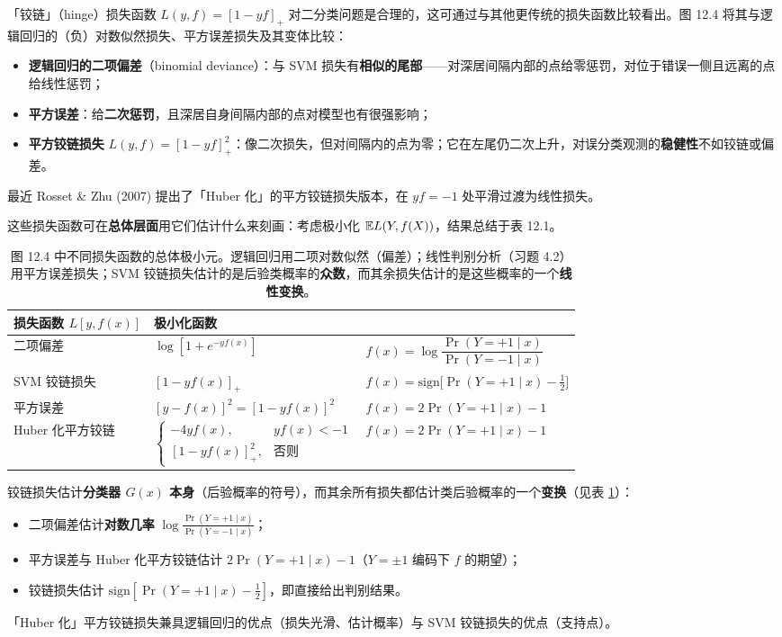 \begin{remark}[铰链损失]
「铰链」（hinge）损失函数 $L(y,f) = [1-yf]_+$ 对二分类问题是合理的，这可通过与其他更传统的损失函数比较看出。图 12.4 将其与逻辑回归的（负）对数似然损失、平方误差损失及其变体比较：
\begin{itemize}
\item \textbf{逻辑回归的二项偏差}（binomial deviance）：与 SVM 损失有\textbf{相似的尾部}——对深居间隔内部的点给零惩罚，对位于错误一侧且远离的点给线性惩罚；
\item \textbf{平方误差}：给\textbf{二次惩罚}，且深居自身间隔内部的点对模型也有很强影响；
\item \textbf{平方铰链损失} $L(y,f) = [1-yf]_+^2$：像二次损失，但对间隔内的点为零；它在左尾仍二次上升，对误分类观测的\textbf{稳健性}不如铰链或偏差。
\end{itemize}
最近 Rosset \& Zhu (2007) 提出了「Huber 化」的平方铰链损失版本，在 $yf=-1$ 处平滑过渡为线性损失。
\end{remark}

这些损失函数可在\textbf{总体层面}用它们估计什么来刻画：考虑极小化 $\mathbb{E} L(Y,f(X))$，结果总结于表 12.1。

\begin{table}[htbp]
\centering
\caption{图 12.4 中不同损失函数的总体极小元。逻辑回归用二项对数似然（偏差）；线性判别分析（习题 4.2）用平方误差损失；SVM 铰链损失估计的是后验类概率的\textbf{众数}，而其余损失估计的是这些概率的一个\textbf{线性变换}。}
\label{tab:12_1}
\begin{tabular}{lll}
\toprule
损失函数 $L[y,f(x)]$ & 极小化函数 \\
\midrule
二项偏差 & $\log[1+e^{-yf(x)}]$ & $f(x) = \log\dfrac{\Pr(Y=+1\mid x)}{\Pr(Y=-1\mid x)}$ \\
SVM 铰链损失 & $[1-yf(x)]_+$ & $f(x) = \mathrm{sign}\!\big[\Pr(Y=+1\mid x) - \tfrac12\big]$ \\
平方误差 & $[y-f(x)]^2 = [1-yf(x)]^2$ & $f(x) = 2\Pr(Y=+1\mid x) - 1$ \\
Huber 化平方铰链 & $\begin{cases} -4yf(x), & yf(x)<-1\\ [1-yf(x)]^2_+, & \text{否则} \end{cases}$ & $f(x) = 2\Pr(Y=+1\mid x) - 1$ \\
\bottomrule
\end{tabular}
\end{table}

\begin{remark}[铰链损失估计的是什么]
铰链损失估计\textbf{分类器 $G(x)$ 本身}（后验概率的符号），而其余所有损失都估计类后验概率的一个\textbf{变换}（见表 \ref{tab:12_1}）：
\begin{itemize}
\item 二项偏差估计\textbf{对数几率} $\log\frac{\Pr(Y=+1\mid x)}{\Pr(Y=-1\mid x)}$；
\item 平方误差与 Huber 化平方铰链估计 $2\Pr(Y=+1\mid x)-1$（$Y=\pm1$ 编码下 $f$ 的期望）；
\item 铰链损失估计 $\mathrm{sign}[\Pr(Y=+1\mid x)-\tfrac12]$，即直接给出判别结果。
\end{itemize}
「Huber 化」平方铰链损失兼具逻辑回归的优点（损失光滑、估计概率）与 SVM 铰链损失的优点（支持点）。
\end{remark}

